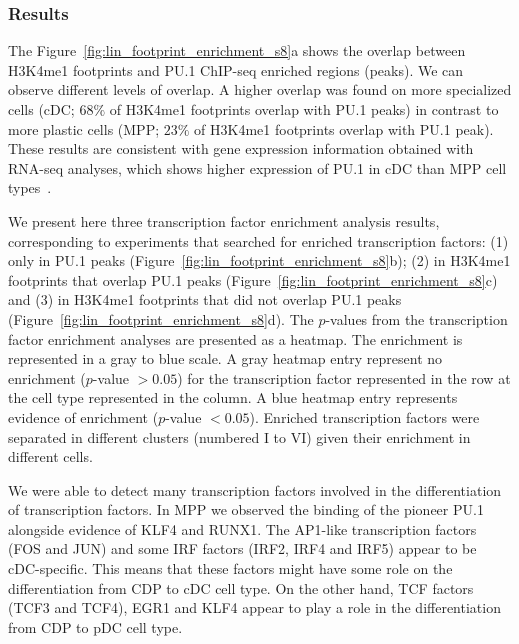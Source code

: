 \subsubsection{Results}
\label{sec:cs1.results}

The Figure~\ref{fig:lin_footprint_enrichment_s8}a shows the overlap between H3K4me1 footprints and PU.1 ChIP-seq enriched regions (peaks). We can observe different levels of overlap. A higher overlap was found on more specialized cells (cDC; \approxy$68\%$ of H3K4me1 footprints overlap with PU.1 peaks) in contrast to more plastic cells (MPP; \approxy$23\%$ of H3K4me1 footprints overlap with PU.1 peak). These results are consistent with gene expression information obtained with RNA-seq analyses, which shows higher expression of PU.1 in cDC than MPP cell types~\cite{lin2015}.

We present here three transcription factor enrichment analysis results, corresponding to experiments that searched for enriched transcription factors: (1) only in PU.1 peaks (Figure~\ref{fig:lin_footprint_enrichment_s8}b); (2) in H3K4me1 footprints that overlap PU.1 peaks (Figure~\ref{fig:lin_footprint_enrichment_s8}c) and (3) in H3K4me1 footprints that did not overlap PU.1 peaks (Figure~\ref{fig:lin_footprint_enrichment_s8}d). The $p$-values from the transcription factor enrichment analyses are presented as a heatmap. The enrichment is represented in a gray to blue scale. A gray heatmap entry represent no enrichment ($p$-value $> 0.05$) for the transcription factor represented in the row at the cell type represented in the column. A blue heatmap entry represents evidence of enrichment ($p$-value $< 0.05$). Enriched transcription factors were separated in different clusters (numbered I to VI) given their enrichment in different cells. 

We were able to detect many transcription factors involved in the differentiation of transcription factors. In MPP we observed the binding of the pioneer PU.1 alongside evidence of KLF4 and RUNX1. The AP1-like transcription factors (FOS and JUN) and some IRF factors (IRF2, IRF4 and IRF5) appear to be cDC-specific. This means that these factors might have some role on the differentiation from CDP to cDC cell type. On the other hand, TCF factors (TCF3 and TCF4), EGR1 and KLF4 appear to play a role in the differentiation from CDP to pDC cell type.

